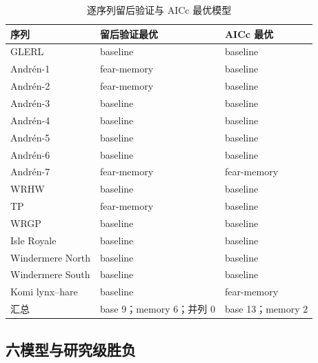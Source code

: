 \documentclass[12pt,a4paper]{ctexart}
\begin{document}
\begin{table}[H]
 \centering
 \caption{逐序列留后验证与 AICc 最优模型}
 \begin{tabular}{lll}
  \toprule
  序列 & 留后验证最优 & AICc 最优\\
  \midrule
  GLERL & baseline & baseline\\
  Andrén-1 & fear-memory & baseline\\
  Andrén-2 & fear-memory & baseline\\
 Andrén-3 & baseline & baseline\\
  Andrén-4 & baseline & baseline\\
 Andrén-5 & baseline & baseline\\
 Andrén-6 & baseline & baseline\\
  Andrén-7 & fear-memory & fear-memory\\
  WRHW & baseline & baseline\\
  TP & fear-memory & baseline\\
  WRGP & baseline & baseline\\
  Isle Royale & baseline & baseline\\
  Windermere North & baseline & baseline\\
  Windermere South & baseline & baseline\\
  Komi lynx--hare & baseline & fear-memory\\
  \midrule
 汇总 & base 9；memory 6；并列 0 & base 13；memory 2\\
  \bottomrule
 \end{tabular}
\end{table}

\subsection{六模型与研究级胜负}
\end{document}
